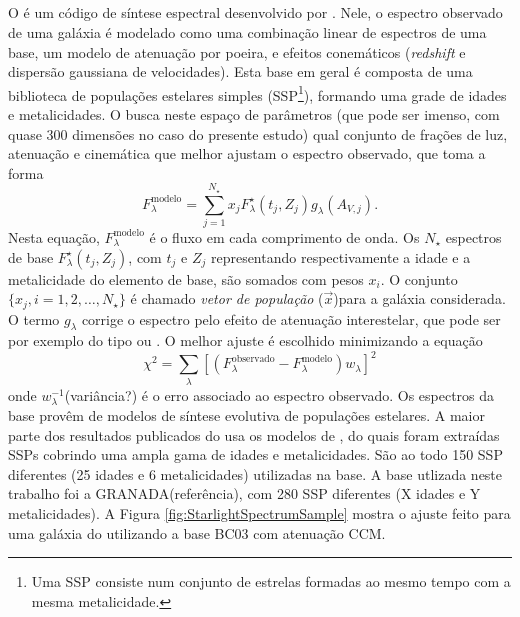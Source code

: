 \subsection{\starlight}

O \starlight é um código de síntese espectral desenvolvido por
\citet{CidFernandes2005}. Nele, o espectro observado de uma galáxia é modelado
como uma combinação linear de espectros de uma base, um modelo de atenuação por
poeira, e efeitos conemáticos ({\em redshift} e dispersão gaussiana de
velocidades). Esta base em geral é composta de uma biblioteca de populações
estelares simples (SSP\footnote{Uma SSP consiste num conjunto de estrelas
formadas ao mesmo tempo com a mesma metalicidade.}), formando uma grade de
idades e metalicidades. O \starlight busca neste espaço de parâmetros (que pode
ser imenso, com quase 300 dimensões no caso do presente estudo) qual conjunto de
frações de luz, atenuação e cinemática que melhor ajustam o espectro observado,
que toma a forma
\begin{equation*}
F^{\mathrm{modelo}}_\lambda = \sum_{j=1}^{N_\star} x_j F^\star_\lambda(t_j,Z_j)
g_\lambda(A_{V,j}).
\end{equation*}
Nesta equação, $F^{\mathrm{modelo}}_\lambda$ é o fluxo em cada comprimento de
onda. Os $N_\star$ espectros de base $F^\star_\lambda(t_j, Z_j)$, com $t_j$ e
$Z_j$ representando respectivamente a idade e a metalicidade do elemento de
base, são somados com pesos $x_i$. O conjunto $\{x_j, i=1,2,\ldots,N_\star\}$
é chamado {\em vetor de população} ($\vec{x}$)para a galáxia considerada. O
termo $g_\lambda$ corrige o espectro pelo efeito de atenuação interestelar, que
pode ser por exemplo do tipo \citep[CCM]{Cardelli1989} ou \citep[CAL]{Calzetti1994}.
O melhor ajuste é escolhido minimizando a equação
\begin{equation*}
\chi^2 = \sum_\lambda \left[(F^{\mathrm{observado}}_\lambda -
F^{\mathrm{modelo}}_\lambda) w_\lambda\right]^2
\end{equation*}
onde $w_\lambda^{-1}$\fixme(variância?) é o erro associado ao espectro
observado.
Os espectros da base provêm de modelos de síntese evolutiva de populações
estelares. A maior parte dos resultados publicados do \starlight usa os modelos
de \citet[BC03]{Bruzual2003}, do quais foram extraídas SSPs cobrindo uma ampla
gama de idades e metalicidades. São ao todo 150 SSP diferentes (25 idades e 6
metalicidades) utilizadas na base. A base utlizada neste trabalho foi a
GRANADA\fixme (referência), com 280 SSP diferentes (X idades e Y
metalicidades)\fixme. A Figura \ref{fig:StarlightSpectrumSample} mostra o ajuste
feito para uma galáxia do \SDSS utilizando a base BC03 com atenuação CCM.

